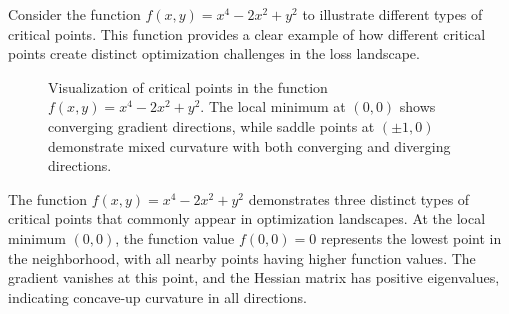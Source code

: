 Consider the function $f(x,y) = x^4 - 2x^2 + y^2$ to illustrate different types of critical points. This function provides a clear example of how different critical points create distinct optimization challenges in the loss landscape.

\begin{figure}[h]
\centering
{}
\caption{Visualization of critical points in the function $f(x,y) = x^4 - 2x^2 + y^2$. The local minimum at $(0,0)$ shows converging gradient directions, while saddle points at $(\pm 1,0)$ demonstrate mixed curvature with both converging and diverging directions.}
\label{fig:critical-points}
\end{figure}

The function $f(x,y) = x^4 - 2x^2 + y^2$ demonstrates three distinct types of critical points that commonly appear in optimization landscapes. At the local minimum $(0,0)$, the function value $f(0,0) = 0$ represents the lowest point in the neighborhood, with all nearby points having higher function values. The gradient vanishes at this point, and the Hessian matrix has positive eigenvalues, indicating concave-up curvature in all directions.

